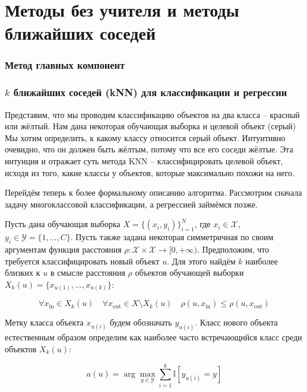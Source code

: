\documentclass[a4paper, 14pt]{article}
\begin{document}
    \part{Методы без учителя и методы ближайших соседей}
    
    \section{Метод главных компонент}
    
    
    \section{$k$ ближайших соседей (kNN) для классификации и регрессии}
    
    Представим, что мы проводим классификацию объектов на два класса -- красный или жёлтый.
    Нам дана некоторая обучающая выборка и целевой объект (серый)
    Мы хотим определить, к какому классу относится серый объект.
    Интуитивно очевидно, что он должен быть жёлтым, потому что все его соседи жёлтые.
    Эта интуиция и отражает суть метода KNN -- классифицировать целевой объект, исходя из того, какие классы у
    объектов, которые максимально похожи на него.
    
    Перейдём теперь к более формальному описанию алгоритма.
    Рассмотрим сначала задачу многоклассовой классификации, а регрессией займёмся позже.
    
    Пусть дана обучающая выборка $X = \{(x_i, y_i)\}_{i=1}^N$, где $x_i \in \mathcal{X}$, $y_i \in \mathcal{Y} =
    \{1, \dots, C\}$.
    Пусть также задана некоторая симметричная по своим аргументам функция расстояния $\rho: \mathcal{X} \times
    \mathcal{X} \to [0, +\infty)$.
    Предположим, что требуется классифицировать новый объект $u$.
    Для этого найдём $k$ наиболее близких к $u$ в смысле расстояния $\rho$ объектов обучающей выборки
    $X_k(u) = \{x_{u(1)}, \dots, x_{u(k)}\}$:
    
    \[ \forall x_{\text{in}} \in X_k(u) \quad \forall x_{\text{out}} \in X \setminus X_k(u) \quad \rho(u, x_{\text{in}})
    \leqslant \rho(u, x_{\text{out}}) \]
    
    Метку класса объекта $x_{u(i)}$ будем обозначать $y_{u(i)}$.
    Класс нового объекта естественным образом определим как наиболее часто встречающийся класс среди объектов $X_k(u)$:
    
    \[ a(u) = \arg\max_{y \in \mathcal{Y}} \sum_{i=1}^k \mathbb{I}[y_{u(i)} = y] \]
    
\end{document}
